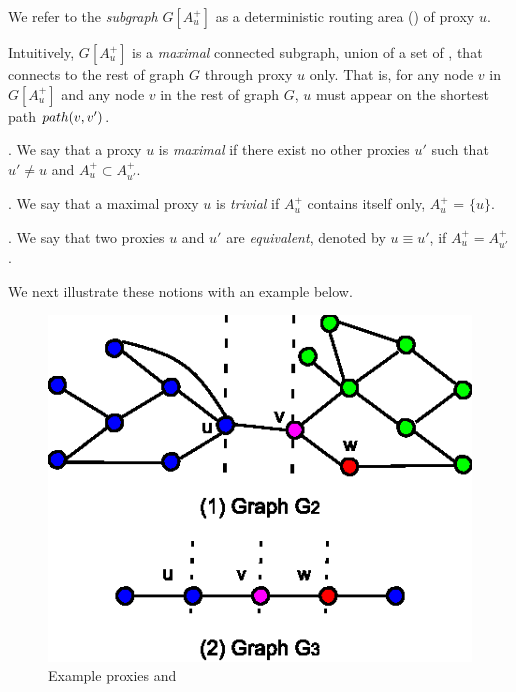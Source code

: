 We refer to the {\em subgraph} $G[A^+_u]$ as a deterministic routing area (\dra) of proxy $u$.

Intuitively, \dra $G[A^+_u]$ is a {\em maximal} connected subgraph, union of a set of \ccs, that connects to the rest of graph $G$ through proxy $u$ only.
That is, for any node $v$ in $G[A^+_u]$ and any node $v$ in the rest of graph $G$, $u$ must appear on the shortest path $\path(v, v')$.

.  We say that a proxy $u$ is {\em maximal} if there exist no other proxies $u'$ such that $u'\ne u$ and $A^+_{u} \subset A^+_{u'}$.

. We say that a maximal proxy $u$ is {\em trivial} if $A^+_u$ contains itself only, \ie $A^+_{u}$ = $\{u\}$.


. We say that two proxies $u$ and $u'$ are {\em equivalent}, denoted by $u\equiv u'$, if $A^+_{u} = A^+_{u'}$.




We next illustrate these notions with an example below.

\begin{figure}
\begin{center}
 \includegraphics[scale=0.95]{./extended-proxies.eps}
\end{center}
 \vspace{-1.5ex}
 \caption{Example proxies and \dras}
  \label{fig-proxies}
\vspace{-2ex}
\end{figure}


